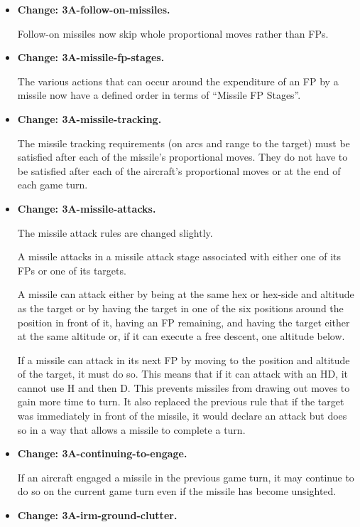 \documentclass{report}
\newcommand{\changetag}[1]{\textbf{Change: #1.}\par}
\begin{document}
\begin{itemize}
    \item\changetag{3A-follow-on-missiles}

        Follow-on missiles now skip whole proportional moves rather than FPs.

    \item\changetag{3A-missile-fp-stages}

        The various actions that can occur around the expenditure of an FP by a missile now have a defined order in terms of “Missile FP Stages”.

    \item\changetag{3A-missile-tracking}

        The missile tracking requirements (on arcs and range to the target) must be satisfied after each of the missile's proportional moves. They do not have to be satisfied after each of the aircraft's proportional moves or at the end of each game turn.

    \item\changetag{3A-missile-attacks}

        The missile attack rules are changed slightly.

        A missile attacks in a missile attack stage associated with either one of its FPs or one of its targets.

        A missile can attack either by being at the same hex or hex-side and altitude as the target or by having the target in one of the six positions around the position in front of it, having an FP remaining, and having the target either at the same altitude or, if it can execute a free descent, one altitude below.

        If a missile can attack in its next FP by moving to the position and altitude of the target, it must do so. This means that if it can attack with an HD, it cannot use H and then D. This prevents missiles from drawing out moves to gain more time to turn. It also replaced the previous rule that if the target was immediately in front of the missile, it would declare an attack but does so in a way that allows a missile to complete a turn.

    \item\changetag{3A-continuing-to-engage}

        If an aircraft engaged a missile in the previous game turn, it may continue to do so on the current game turn even if the missile has become unsighted.

    \item\changetag{3A-irm-ground-clutter}


\end{itemize}
\end{document}
